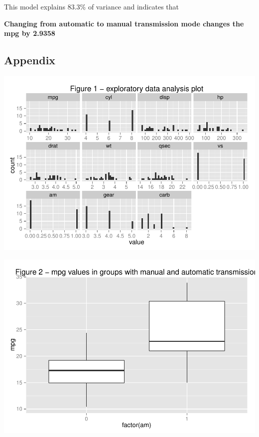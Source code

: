 \documentclass[10pt,]{article}
\begin{document}
This model explains 83.3\% of variance and indicates that

\textbf{Changing from automatic to manual transmission mode changes the
mpg by 2.9358}

\subsection{Appendix}\label{appendix}

\begin{flushleft}\includegraphics{project_files/figure-latex/unnamed-chunk-2-1} \end{flushleft}

\begin{flushleft}\includegraphics{project_files/figure-latex/mpg_automatic_vs_manual-1} \end{flushleft}
\end{document}
